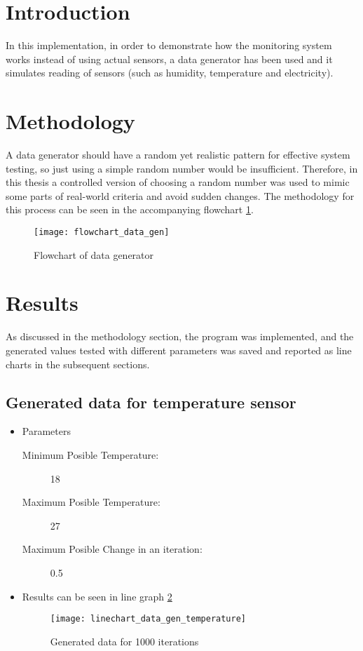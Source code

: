 \section{Introduction}
    In this implementation, in order to demonstrate how the monitoring system works instead of using actual sensors, a data generator has been used and it simulates reading of sensors (such as humidity, temperature and electricity).

\section{Methodology}
A data generator should have a random yet realistic pattern for effective system testing, so just using a simple random number would be insufficient. Therefore, in this thesis a controlled version of choosing a random number was used to mimic some parts of real-world criteria and avoid sudden changes. The methodology for this process can be seen in the accompanying flowchart \ref{chart:data_gen}.

    \begin{figure}
        \centering
        \captionsetup{type=figure}
        \texttt{[image: flowchart\_data\_gen]}
        \caption{Flowchart of data generator}
        \label{chart:data_gen}
    \end{figure}
\section{Results}
    As discussed in the methodology section, the program was implemented, and the generated values tested with different parameters was saved and reported as line charts in the subsequent sections.
    \subsection{Generated data for temperature sensor}
        \begin{itemize}
            \item Parameters
                \begin{description}
                    \item[Minimum Posible Temperature:] 18
                    \item[Maximum Posible Temperature:] 27
                    \item[Maximum Posible Change in an iteration:] 0.5
                \end{description}
            \item Results can be seen in line graph \ref{chart:gen_temperature}
                \begin{figure}
                    \centering
                    \captionsetup{type=figure}
                    \texttt{[image: linechart\_data\_gen\_temperature]}
                    \caption{Generated data for 1000 iterations}
                    \label{chart:gen_temperature}
                \end{figure}
        \end{itemize}
